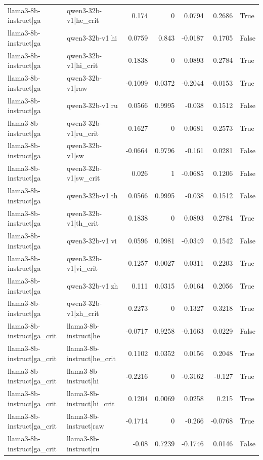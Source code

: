 \begin{table}
\begin{tabular}{l l r r r r l}
llama3-8b-instruct|ga & qwen3-32b-v1|he_crit & 0.174 & 0 & 0.0794 & 0.2686 & True \\
llama3-8b-instruct|ga & qwen3-32b-v1|hi & 0.0759 & 0.843 & -0.0187 & 0.1705 & False \\
llama3-8b-instruct|ga & qwen3-32b-v1|hi_crit & 0.1838 & 0 & 0.0893 & 0.2784 & True \\
llama3-8b-instruct|ga & qwen3-32b-v1|raw & -0.1099 & 0.0372 & -0.2044 & -0.0153 & True \\
llama3-8b-instruct|ga & qwen3-32b-v1|ru & 0.0566 & 0.9995 & -0.038 & 0.1512 & False \\
llama3-8b-instruct|ga & qwen3-32b-v1|ru_crit & 0.1627 & 0 & 0.0681 & 0.2573 & True \\
llama3-8b-instruct|ga & qwen3-32b-v1|sw & -0.0664 & 0.9796 & -0.161 & 0.0281 & False \\
llama3-8b-instruct|ga & qwen3-32b-v1|sw_crit & 0.026 & 1 & -0.0685 & 0.1206 & False \\
llama3-8b-instruct|ga & qwen3-32b-v1|th & 0.0566 & 0.9995 & -0.038 & 0.1512 & False \\
llama3-8b-instruct|ga & qwen3-32b-v1|th_crit & 0.1838 & 0 & 0.0893 & 0.2784 & True \\
llama3-8b-instruct|ga & qwen3-32b-v1|vi & 0.0596 & 0.9981 & -0.0349 & 0.1542 & False \\
llama3-8b-instruct|ga & qwen3-32b-v1|vi_crit & 0.1257 & 0.0027 & 0.0311 & 0.2203 & True \\
llama3-8b-instruct|ga & qwen3-32b-v1|zh & 0.111 & 0.0315 & 0.0164 & 0.2056 & True \\
llama3-8b-instruct|ga & qwen3-32b-v1|zh_crit & 0.2273 & 0 & 0.1327 & 0.3218 & True \\
llama3-8b-instruct|ga_crit & llama3-8b-instruct|he & -0.0717 & 0.9258 & -0.1663 & 0.0229 & False \\
llama3-8b-instruct|ga_crit & llama3-8b-instruct|he_crit & 0.1102 & 0.0352 & 0.0156 & 0.2048 & True \\
llama3-8b-instruct|ga_crit & llama3-8b-instruct|hi & -0.2216 & 0 & -0.3162 & -0.127 & True \\
llama3-8b-instruct|ga_crit & llama3-8b-instruct|hi_crit & 0.1204 & 0.0069 & 0.0258 & 0.215 & True \\
llama3-8b-instruct|ga_crit & llama3-8b-instruct|raw & -0.1714 & 0 & -0.266 & -0.0768 & True \\
llama3-8b-instruct|ga_crit & llama3-8b-instruct|ru & -0.08 & 0.7239 & -0.1746 & 0.0146 & False \\

\end{tabular}
\end{table}
